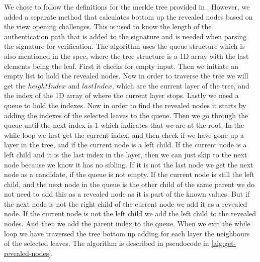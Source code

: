 \documentclass[11pt]{report}
\theoremstyle{definition}
\theoremstyle{plain}
\begin{document}
We chose to follow the definitions for the merkle tree provided in \cite{aguilarsyndrome11}. However, we added a separate method that calculates bottom up the revealed nodes based on the view opening challenges. This is used to know the length of the authentication path that is added to the signature and is needed when parsing the signature for verification. The algorithm uses the queue structure which is also mentioned in the spec, where the tree structure is a 1D array with the last elements being the leaf. First it checks for empty input. Then we initiate an empty list to hold the revealed nodes. Now in order to traverse the tree we will get the $heightIndex$ and $lastIndex$, which are the current layer of the tree, and the index of the 1D array of where the current layer stops. Lastly we need a queue to hold the indexes. Now in order to find the revealed nodes it starts by adding the indexes of the selected leaves to the queue. Then we go through the queue until the next index is $1$ which indicates that we are at the root. In the while loop we first get the current index, and then check if we have gone up a layer in the tree, and if the current node is a left child. If the current node is a left child and it is the last index in the layer, then we can just skip to the next node because we know it has no sibling. If it is not the last node we get the next node as a candidate, if the queue is not empty. If the current node is still the left child, and the next node in the queue is the other child of the same parent we do not need to add this as a revealed node as it is part of the known values. But if the next node is not the right child of the current node we add it as a revealed node. If the current node is not the left child we add the left child to the revealed nodes. And then we add the parent index to the queue. When we exit the while loop we have traversed the tree bottom up adding for each layer the neighbours of the selected leaves. The algorithm is described in pseudocode in \autoref{alg:get-revealed-nodes}.
\end{document}
